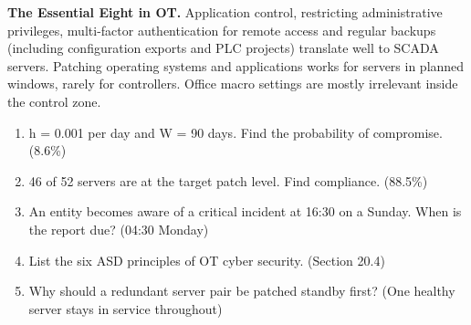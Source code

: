 \textbf{The Essential Eight in OT.} Application control, restricting administrative privileges, multi-factor authentication for remote access and regular backups (including configuration exports and PLC projects) translate well to SCADA servers. Patching operating systems and applications works for servers in planned windows, rarely for controllers. Office macro settings are mostly irrelevant inside the control zone.

\begin{enumerate}
\item h = 0.001 per day and W = 90 days. Find the probability of compromise. (8.6\%)
\item 46 of 52 servers are at the target patch level. Find compliance. (88.5\%)
\item An entity becomes aware of a critical incident at 16:30 on a Sunday. When is the report due? (04:30 Monday)
\item List the six ASD principles of OT cyber security. (Section 20.4)
\item Why should a redundant server pair be patched standby first? (One healthy server stays in service throughout)
\end{enumerate}
